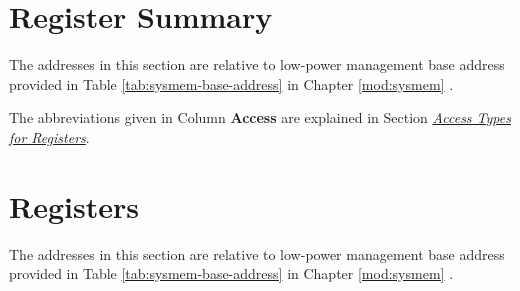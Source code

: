 \documentclass[main\_\_EN.tex]{subfiles}
\begin{document}
\clearpage
\section{Register Summary}\hypertarget{lowpowm-reg-summ}{}\label{sec:lowpowm-reg-summ}


The addresses in this section are relative to low-power management base address provided in Table \ref{tab:sysmem-base-address} in Chapter \ref{mod:sysmem} \textit{}.

The abbreviations given in Column \textbf{Access} are explained in Section \hyperref[glossary-access-types]{\textit{Access Types for Registers}}.




\clearpage
\section{Registers}

The addresses in this section are relative to low-power management base address provided in Table \ref{tab:sysmem-base-address} in Chapter \ref{mod:sysmem} \textit{}.


\end{document}
